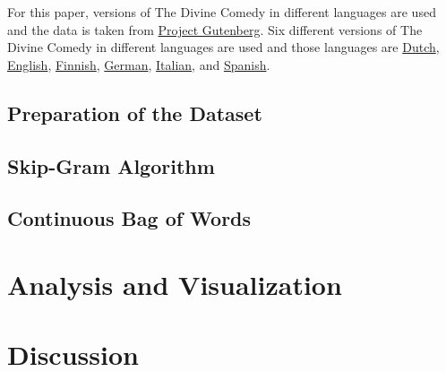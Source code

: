 \documentclass[man]{apa7}
\begin{document}
For this paper, versions of The Divine Comedy in different languages are used and the data is taken from \href{https://www.gutenberg.org/}{Project Gutenberg}. Six different versions of The Divine Comedy in different languages are used and those languages are \href{https://www.gutenberg.org/cache/epub/39181/pg39181-images.html}{Dutch}, \href{https://www.gutenberg.org/cache/epub/1004/pg1004-images.html}{English}, \href{https://www.gutenberg.org/cache/epub/12546/pg12546.html}{Finnish}, \href{https://www.gutenberg.org/cache/epub/8085/pg8085.html}{German}, \href{https://www.gutenberg.org/cache/epub/1000/pg1000-images.html}{Italian}, and \href{https://www.gutenberg.org/cache/epub/57303/pg57303-images.html}{Spanish}.

\subsection{Preparation of the Dataset}



\subsection{Skip-Gram Algorithm}

\subsection{Continuous Bag of Words}

\section{Analysis and Visualization}

\section{Discussion}
\end{document}
